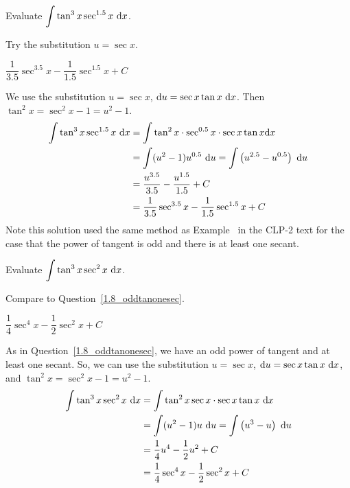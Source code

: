 \begin{question}\label{1.8_oddtanonesec}
Evaluate $\displaystyle\int \tan^3 x \sec^{1.5} x ~\mathrm{d}x$.
\end{question}
\begin{hint}
Try the substitution $u=\sec x$.
\end{hint}
\begin{answer}
$\dfrac{1}{3.5}\sec^{3.5}x - \dfrac{1}{1.5}\sec^{1.5}x+C$
\end{answer}
\begin{solution}
We use the substitution $u=\sec x$, $\mathrm{d}u = \sec x \tan x~\mathrm{d}x$. Then $\tan^2 x = \sec^2 x - 1 = u^2-1$.
\begin{align*}
\int \tan^3 x \sec^{1.5} x ~\mathrm{d}x &= \int \tan^2 x \cdot \sec^{0.5}x \cdot \sec x \tan x \mathrm{d}x\\
&=\int(u^2-1)u^{0.5}~\mathrm{d}u = \int \left(u^{2.5} - u^{0.5}\right)~\mathrm{d}u\\
&=\frac{u^{3.5}}{3.5} - \frac{u^{1.5}}{1.5}+C\\
&=\frac{1}{3.5}\sec^{3.5}x - \frac{1}{1.5}\sec^{1.5}x+C
\end{align*}
Note this solution used the same method as Example~  in the CLP-2 text for the case that the power of tangent is odd and there is at least one secant.
\end{solution}





\begin{question}\label{1.8_oddtanonesec2}
Evaluate $\displaystyle\int \tan^3x\sec^2x~\mathrm{d}x$.
\end{question}
\begin{hint}
Compare to Question~\ref{1.8_oddtanonesec}.
\end{hint}
\begin{answer}
$\dfrac{1}{4}\sec^4 x - \dfrac{1}{2}\sec^2 x +C$
\end{answer}
\begin{solution}
As in Question~\ref{1.8_oddtanonesec}, we have an odd power of tangent and at least one secant. So, we can use the substitution $u=\sec x$, $\mathrm{d}u=\sec x \tan x~\mathrm{d}x$, and $\tan^2 x = \sec^2 x -1=u^2-1$.
\begin{align*}
\int \tan^3x\sec^2x~\mathrm{d}x&=\int \tan^2 x \sec x \cdot \sec x \tan x~\mathrm{d}x\\
&=\int(u^2-1)u~\mathrm{d}u = \int \left(u^3-u\right)~\mathrm{d}u\\
&=\frac{1}{4}u^4 - \frac{1}{2}u^2+C\\
&=\frac{1}{4}\sec^4 x - \frac{1}{2}\sec^2 x +C
\end{align*}
\end{solution}

